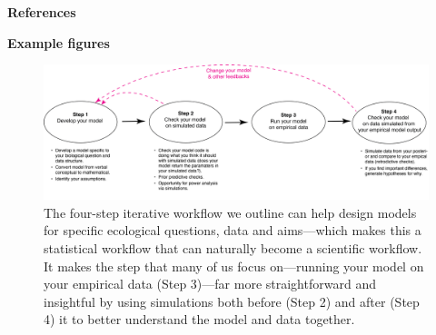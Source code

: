 \documentclass[11pt]{article}
\begin{document}
{\bf References}
\vspace{-8ex}


\newpage
{\bf Example figures}

\begin{figure}[ht]
\centering
\noindent \includegraphics[width=1\textwidth]{..//figures/workflow.png}
\caption{The four-step iterative workflow we outline can help design models for specific ecological questions, data and aims---which makes this a statistical workflow that can naturally become a scientific workflow. It makes the step that many of us focus on---running your model on your empirical data (Step 3)---far more straightforward and insightful by using simulations both before (Step 2) and after (Step 4) it to better understand the model and data together.}
\label{fig:workflow}
\end{figure}
\end{document}
